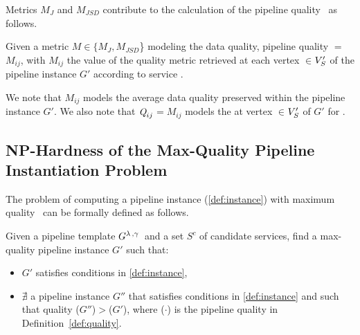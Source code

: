 Metrics $M_J$ and $M_{JSD}$ contribute to the calculation of the pipeline quality \q\ as follows. %

\vspace{0.5em}

\begin{definition}[\emph{\quality}]\label{def:quality}
  Given a metric $M$$\in$$\{M_J,M_{JSD}$\} modeling the data quality, pipeline quality \q$=$$M_{ij}$, with $M_{ij}$ the value of the quality metric retrieved at each vertex $\in$$V'_S$ of the pipeline instance $G'$ according to service .
\end{definition}

\vspace{0.5em}

We note that $M_{ij}$ models the average data quality preserved within the pipeline instance $G'$.
We also note that $\textit{Q}_{ij}$$=$$M_{ij}$ models the \quality at vertex $\in$$V'_S$ of $G'$ for .

\subsection{NP-Hardness of the Max-Quality Pipeline Instantiation Problem}\label{sec:nphard}
The problem of computing a pipeline instance (\cref{def:instance}) with maximum quality \q\ can be formally defined as follows.

\vspace{0.5em}

\begin{definition}\label{def:MaXQualityInstance}
  Given a pipeline template $G^{\lambda\,,\gamma\,}$ and a set $S^c$ of candidate services, find a max-quality pipeline instance $G'$ such that:
  \begin{itemize}
    \item $G'$ satisfies conditions in \cref{def:instance},
    \item $\nexists$ a pipeline instance $G''$ that satisfies conditions in \cref{def:instance} and such that quality \q($G''$)$>$\q($G'$), where \q($\cdot$) is the pipeline quality in Definition~\ref{def:quality}.
  \end{itemize}
\end{definition}

